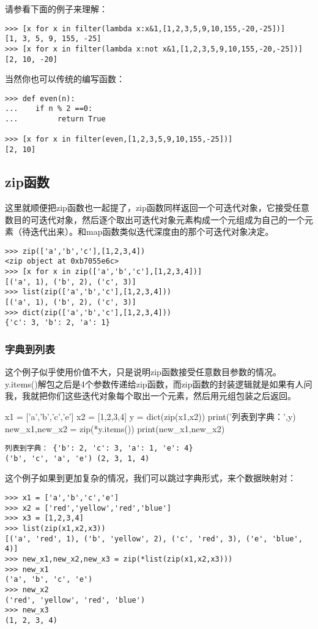 \documentclass[12pt,oneside]{book}
\begin{document}
\begin{common-format}
请参看下面的例子来理解：
\begin{Verbatim}
>>> [x for x in filter(lambda x:x&1,[1,2,3,5,9,10,155,-20,-25])]
[1, 3, 5, 9, 155, -25]
>>> [x for x in filter(lambda x:not x&1,[1,2,3,5,9,10,155,-20,-25])]
[2, 10, -20]
\end{Verbatim}


当然你也可以传统的编写函数：
\begin{Verbatim}
>>> def even(n):
...    if n % 2 ==0:
...         return True

>>> [x for x in filter(even,[1,2,3,5,9,10,155,-25])]
[2, 10]
\end{Verbatim}

\subsection{zip函数}
这里就顺便把zip函数也一起提了，zip函数同样返回一个可迭代对象，它接受任意数目的可迭代对象，然后逐个取出可迭代对象元素构成一个元组成为自己的一个元素（待迭代出来）。和map函数类似迭代深度由的那个可迭代对象决定。
\begin{Verbatim}
>>> zip(['a','b','c'],[1,2,3,4])
<zip object at 0xb7055e6c>
>>> [x for x in zip(['a','b','c'],[1,2,3,4])]
[('a', 1), ('b', 2), ('c', 3)]
>>> list(zip(['a','b','c'],[1,2,3,4]))
[('a', 1), ('b', 2), ('c', 3)]
>>> dict(zip(['a','b','c'],[1,2,3,4]))
{'c': 3, 'b': 2, 'a': 1}
\end{Verbatim}

\subsubsection{字典到列表}
这个例子似乎使用价值不大，只是说明zip函数接受任意数目参数的情况。y.items()解包之后是4个参数传递给zip函数，而zip函数的封装逻辑就是如果有人问我，我就把你们这些迭代对象每个取出一个元素，然后用元组包装之后返回。
\begin{tcbpython}[]
x1 = ['a','b','c','e']
x2 = [1,2,3,4]
y = dict(zip(x1,x2))
print('列表到字典：',y)
new_x1,new_x2 = zip(*y.items())
print(new_x1,new_x2)
\end{tcbpython}
\begin{Verbatim}
列表到字典： {'b': 2, 'c': 3, 'a': 1, 'e': 4}
('b', 'c', 'a', 'e') (2, 3, 1, 4)
\end{Verbatim}


这个例子如果到更加复杂的情况，我们可以跳过字典形式，来个数据映射对：
\begin{Verbatim}
>>> x1 = ['a','b','c','e']
>>> x2 = ['red','yellow','red','blue']
>>> x3 = [1,2,3,4]
>>> list(zip(x1,x2,x3))
[('a', 'red', 1), ('b', 'yellow', 2), ('c', 'red', 3), ('e', 'blue', 4)]
>>> new_x1,new_x2,new_x3 = zip(*list(zip(x1,x2,x3)))
>>> new_x1
('a', 'b', 'c', 'e')
>>> new_x2
('red', 'yellow', 'red', 'blue')
>>> new_x3
(1, 2, 3, 4)
\end{Verbatim}


\end{common-format}
\end{document}
